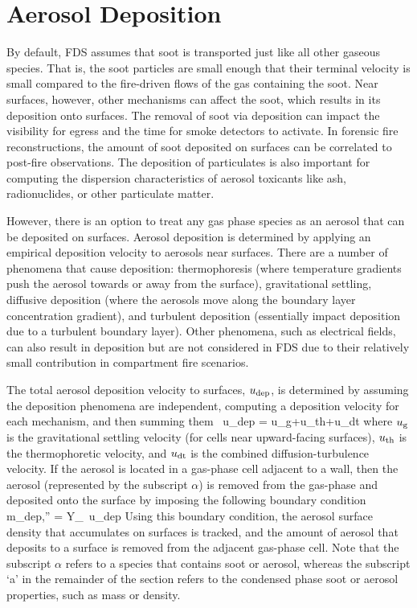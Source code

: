 \newpage
\section{Aerosol Deposition}

By default, FDS assumes that soot is transported just like all other gaseous species. That is, the soot particles are small enough that their terminal velocity is small compared to the fire-driven flows of the gas containing the soot. Near surfaces, however, other mechanisms can affect the soot, which results in its deposition onto surfaces. The removal of soot via deposition can impact the visibility for egress and the time for smoke detectors to activate. In forensic fire reconstructions, the amount of soot deposited on surfaces can be correlated to post-fire observations. The deposition of particulates is also important for computing the dispersion characteristics of aerosol toxicants like ash, radionuclides, or other particulate matter.

However, there is an option to treat any gas phase species as an aerosol that can be deposited on surfaces. Aerosol deposition is determined by applying an empirical deposition velocity to aerosols near surfaces. There are a number of phenomena that cause deposition: thermophoresis (where temperature gradients push the aerosol towards or away from the surface), gravitational settling, diffusive deposition (where the aerosols move along the boundary layer concentration
gradient), and turbulent deposition (essentially impact deposition due to a turbulent boundary layer). Other phenomena, such as electrical fields, can also result in deposition but are not considered in FDS due to their relatively small contribution in compartment fire scenarios.

The total aerosol deposition velocity to surfaces, $u_{\rm dep}$, is determined by assuming the deposition phenomena are independent, computing a deposition velocity for each mechanism, and then summing them~\cite{Bixler:1}
\be
u_{\rm dep} = u_{\rm g}+u_{\rm th}+u_{\rm dt}
\ee
where $u_{\rm g}$ is the gravitational settling velocity (for cells near upward-facing surfaces), $u_{\rm th}$ is the thermophoretic velocity, and $u_{\rm dt}$ is the combined diffusion-turbulence velocity. If the aerosol is located in a gas-phase cell adjacent to a wall, then the aerosol (represented by the subscript $\alpha$) is removed from the gas-phase and deposited onto the surface by imposing the following boundary condition
\be
\dot m_{\rm dep,\alpha}'' = \rho Y_\alpha \, u_{\rm dep}
\ee
Using this boundary condition, the aerosol surface density that accumulates on surfaces is tracked, and the amount
of aerosol that deposits to a surface is removed from the adjacent gas-phase cell.
Note that the subscript $\alpha$ refers to a species that contains soot or aerosol, whereas the subscript `a'
in the remainder of the section refers to the condensed phase soot or aerosol properties, such as mass or density.

